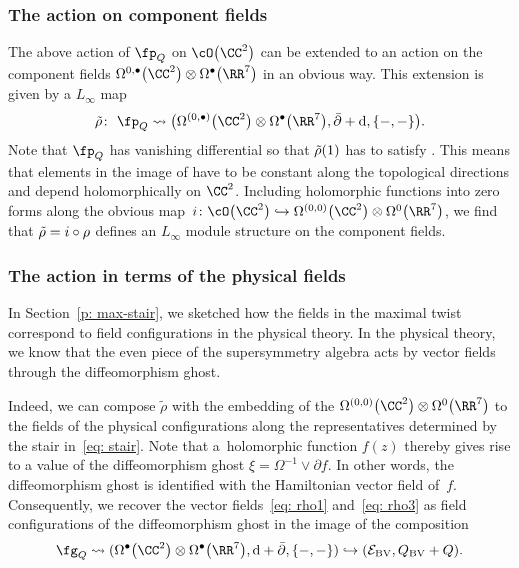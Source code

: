 \documentclass[10pt,a4paper]{amsart}
\numberwithin{equation}{section}
\theoremstyle{definition}
\def\cE{\mathcal E}\def\cF{\mathcal F}\def\cG{\mathcal G}\def\cH{\mathcal H}
\def\d{{\rm d}}
\def\bu{\bullet}
\begin{document}
\subsubsection{The action on component fields}
The above action of $\fp_Q$ on $\cO\big(\CC^2\big)$ can be extended to an action on the component fields $\Omega^{0,\bu}\big(\CC^2\big) \otimes \Omega^\bu\big(\RR^7\big)$ in an obvious way. This extension is given by a $L_\infty$ map
\[
 \Tilde{\rho}\colon\ \fp_Q \rightsquigarrow \big(\Omega^{(0,\bu)}\big(\CC^2\big) \otimes \Omega^\bullet\big(\RR^7\big) , \bar{\partial} + \d , \{-,-\} \big).
\]
Note that $\fp_Q$ has vanishing differential so that $\Tilde{\rho}{(1)}$ has to satisfy
\smash{$
 \big(\d + \bar{\partial}\big) \circ \Tilde{\rho}^{(1)} = 0$}.
This means that elements in the image of  have to be constant along the topological directions and depend holomorphically on $\CC^2$. Including holomorphic functions into zero forms along the obvious map~${i \colon \cO\big(\CC^2\big) \hookrightarrow \Omega^{(0,0)}\big(\CC^2\big) \otimes \Omega^0\big(\RR^7\big)}$, we find that $\Tilde{\rho} = i \circ \rho$ defines an $L_\infty$ module structure on the component fields.

\subsubsection{The action in terms of the physical fields}
In Section~\ref{p: max-stair}, we sketched how the fields in the maximal twist correspond to field configurations in the physical theory. In the physical theory, we know that the even piece of the supersymmetry algebra acts by vector fields through the diffeomorphism ghost.

Indeed, we can compose $\tilde{\rho}$ with the embedding of the $\Omega^{(0,0)}\big(\CC^2\big) \otimes \Omega^0\big(\RR^7\big)$ to the fields of the physical configurations along the representatives determined by the stair in~\eqref{eq: stair}. Note that a~holomorphic function $f(z)$ thereby gives rise to a value of the diffeomorphism ghost $
 \xi = \Omega^{-1} \vee \partial f $.
In other words, the diffeomorphism ghost is identified with the Hamiltonian vector field of~$f$. Consequently, we recover the vector fields~\eqref{eq: rho1} and~\eqref{eq: rho3} as field configurations of the diffeomorphism ghost in the image of the composition
\[
 \fg_Q \rightsquigarrow (\Omega^\bu\big(\CC^2\big) \otimes \Omega^\bu\big(\RR^7\big) , \d + \bar{\partial} , \{-,-\} ) \hookrightarrow (\cE_{\rm BV} , Q_{\rm BV} + Q) .
\]
\end{document}
